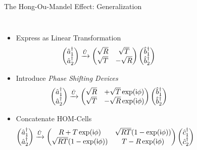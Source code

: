 \begin{frame}[t]{The Hong-Ou-Mandel Effect: Generalization}
%
\begin{columns}
\begin{itemize}
\item Express as Linear Transformation
	\begin{align*}
		\begin{pmatrix}
			\cre_1 \\
			\cre_2
		\end{pmatrix}
	\xrightarrow{\opU}
		\begin{pmatrix}
			\sqrt{R} &  \sqrt{T} \\
			\sqrt{T} & -\sqrt{R}
		\end{pmatrix}
		\begin{pmatrix}
			\cre[b]_1 \\
			\cre[b]_2
		\end{pmatrix}
	\end{align*}
\item Introduce \emph{Phase Shifting Devices}
	\begin{align*}
		\begin{pmatrix}
			\cre_1 \\
			\cre_2
		\end{pmatrix}
	\xrightarrow{\opU}
		\begin{pmatrix}
			\sqrt{R} & +\sqrt{T} \exp(\iunit \phi)  \\
			\sqrt{T} & -\sqrt{R} \exp(\iunit \phi)
		\end{pmatrix}
		\begin{pmatrix}
			\cre[b]_1 \\
			\cre[b]_2
		\end{pmatrix}
	\end{align*}
\item Concatenate HOM-Cells
	\begin{align*}
		\begin{pmatrix}
			\cre_1 \\
			\cre_2
		\end{pmatrix}
	&\xrightarrow{\opU}
			\begin{pmatrix}
			R + T \exp(\iunit \phi)           & \sqrt{RT} (1 - \exp(\iunit \phi)) \\
			\sqrt{RT} (1 - \exp(\iunit \phi)) & T - R \exp(\iunit \phi)
		\end{pmatrix}
		\begin{pmatrix}
			\cre[c]_1 \\
			\cre[c]_2
		\end{pmatrix}

\end{align*}
\end{itemize}
\end{columns}
\end{frame}
